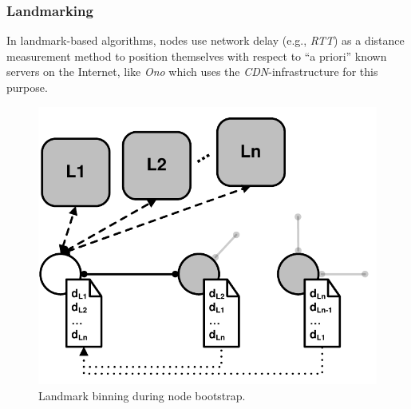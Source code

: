 
\subsubsection{Landmarking}\label{sec:landmark}

In landmark-based algorithms, nodes use network delay (e.g., \emph{RTT}) as a
distance measurement method to position themselves with respect to ``a priori''
known servers on the Internet, like \emph{Ono} which uses the \emph{CDN}-infrastructure
for this purpose.

\begin{figure}[ht]
\centering
  \includegraphics[scale=0.34]{img/pdf/landmarking.pdf}
\caption{Landmark binning during node bootstrap.}
\label{figure:landmarking}
\end{figure}

